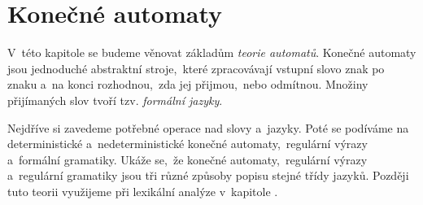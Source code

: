 \chapter{Konečné automaty}\label{chap:automaty}
V~této kapitole se budeme věnovat základům \emph{teorie automatů}. Konečné automaty jsou jednoduché abstraktní stroje,~které zpracovávají vstupní slovo znak po znaku a~na konci rozhodnou,~zda jej přijmou,~nebo odmítnou. Množiny přijímaných slov tvoří tzv. \emph{formální jazyky}.

Nejdříve si zavedeme potřebné operace nad slovy a~jazyky. Poté se podíváme na deterministické a~nedeterministické konečné automaty,~regulární výrazy a~formální gramatiky. Ukáže se,~že konečné automaty,~regulární výrazy a~regulární gramatiky jsou tři různé způsoby popisu stejné třídy jazyků. Později tuto teorii využijeme při lexikální analýze v~kapitole .







